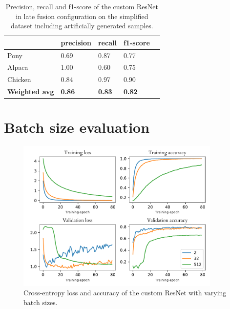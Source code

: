 \documentclass{l4proj}
\begin{document}
\begin{appendices}
\begin{table}[H]
  \centering
  \begin{tabular}{@{}lllll@{}}
  \toprule
                        & \textbf{precision} & \textbf{recall} & \textbf{f1-score} &  \\ \midrule
  Pony                  & 0.69               & 0.87            & 0.77              &  \\
  Alpaca                & 1.00               & 0.60            & 0.75              &  \\
  Chicken               & 0.84               & 0.97            & 0.90              &  \\
  \midrule
  \textbf{Weighted avg} & \textbf{0.86}      & \textbf{0.83}   & \textbf{0.82}     &  \\ \bottomrule
  \end{tabular}
  \vspace*{3mm}
  \caption{Precision, recall and f1-score of the custom ResNet in late fusion configuration on the simplified dataset including artificially generated samples.}
  \label{table:auto_scores_auto}
  \vspace*{-3mm}
\end{table}


\chapter{Batch size evaluation}
\label{appendix_batch_size}

\begin{figure}[ht]
  \centering
  \includegraphics[width=0.9\textwidth]{images/evaluation/batch_size/history}
  \caption{Cross-entropy loss and accuracy of the custom ResNet with varying batch sizes.}
  \label{fig:batch_size}
\end{figure}


\end{appendices}
\end{document}
